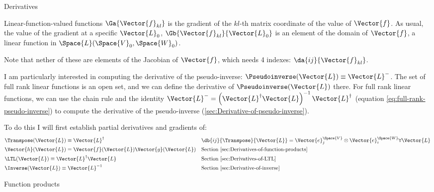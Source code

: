 \begin{plSection}{Derivatives}
\begin{plSection}{Linear-function-valued functions}
$\Ga{\Vector{f}_{kl}}$ is the gradient of the $kl$-th matrix coordinate of the value of $\Vector{f}$.
As usual, the value of the gradient at a specific $\Vector{L}_0$,
$\Gb{\Vector{f}_{kl}}{\Vector{L}_0}$ is an element of the domain of $\Vector{f}$,
a linear function in $\Space{L}(\Space{V}_0,\Space{W}_0)$.

Note that nether of these are elements of the Jacobian of $\Vector{f}$,
which needs 4 indexes: $\da{ij}{\Vector{f}_{kl}}$.

I am particularly interested in computing the derivative of the
pseudo-inverse: $\Pseudoinverse(\Vector{L}) \equiv \Vector{L}^{-}$.
The set of full rank linear functions is an open set,
and we can define the derivative of $\Pseudoinverse(\Vector{L})$ there.
For full rank linear functions,
we can use the chain rule and the identity
$\Vector{L}^{-} = \left( \Vector{L}^{\dagger} \Vector{L} \right)^{-1} \Vector{L}^{\dagger}$
(equation \ref{eq:full-rank-pseudo-inverse})
to compute the derivative of the pseudo-inverse
(\cref{sec:Derivative-of-pseudo-inverse}).

To do this I will first establish partial derivatives and gradients of:
\begin{equation}
\begin{aligned}
\label{eq:transpose-derivative}
&\Transpose(\Vector{L}) \equiv \Vector{L}^{\dagger}
&&\db{ij}{\Transpose}{\Vector{L}} =  \Vector{e}_j^{\Space{V}} \otimes \Vector{e}_i^{\Space{W}}
\forall \Vector{L}
\\
&\Vector{h}( \Vector{L} ) = \Vector{f} ( \Vector{L} ) \Vector{g} ( \Vector{L} )
&&\text{Section~\ref{sec:Derivatives-of-function-products} }
\\
&\LTL(\Vector{L}) \equiv \Vector{L}^{\dagger} \Vector{L}
&&\text{Section~\ref{sec:Derivatives-of-LTL} }
\\
&\Inverse(\Vector{L}) \equiv \Vector{L}^{-1}
&&\text{Section~\ref{sec:Derivative-of-inverse} }
\end{aligned}
\end{equation}

\begin{plSection}{Function products}
\label{sec:Derivatives-of-function-products}


\end{plSection}
\end{plSection}
\end{plSection}
